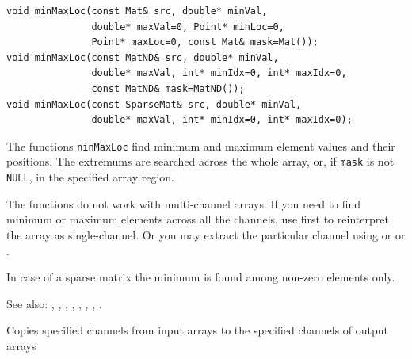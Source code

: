 \begin{lstlisting}
void minMaxLoc(const Mat& src, double* minVal,
               double* maxVal=0, Point* minLoc=0,
               Point* maxLoc=0, const Mat& mask=Mat());
void minMaxLoc(const MatND& src, double* minVal,
               double* maxVal, int* minIdx=0, int* maxIdx=0,
               const MatND& mask=MatND());
void minMaxLoc(const SparseMat& src, double* minVal,
               double* maxVal, int* minIdx=0, int* maxIdx=0);
\end{lstlisting}
\begin{description}
\end{description}

The functions \texttt{ninMaxLoc} find minimum and maximum element values
and their positions. The extremums are searched across the whole array, or,
if \texttt{mask} is not \texttt{NULL}, in the specified array region.

The functions do not work with multi-channel arrays. If you need to find minimum or maximum elements across all the channels, use  first to reinterpret the array as single-channel. Or you may extract the particular channel using  or  or .

In case of a sparse matrix the minimum is found among non-zero elements only.

See also: , , , , , , , .

\label{mixChannels}
Copies specified channels from input arrays to the specified channels of output arrays

